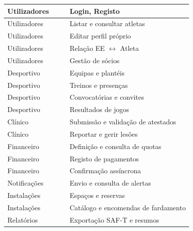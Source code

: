\begin{center}
{\begin{xltabular}{\textwidth}{|>{\raggedright\arraybackslash}p{2cm}|>{\raggedright\arraybackslash}p{4cm}|>{\raggedright\arraybackslash}p{3.7cm}|>{\raggedright\arraybackslash}X|}
Utilizadores  &           &          & Login, Registo \\ \hline
Utilizadores  &       &      & Listar e consultar atletas \\ \hline
Utilizadores  &        &       & Editar perfil próprio \\ \hline
Utilizadores  &       &      & Relação EE $\leftrightarrow$ Atleta \\ \hline
Utilizadores  &         &        & Gestão de sócios \\ \hline
Desportivo    &          &        & Equipas e plantéis \\ \hline
Desportivo    &        &    & Treinos e presenças \\ \hline
Desportivo    &  &        & Convocatórias e convites \\ \hline
Desportivo    &    &       & Resultados de jogos \\ \hline
Clínico       &      &      & Submissão e validação de atestados \\ \hline
Clínico       &         &   & Reportar e gerir lesões \\ \hline
Financeiro    &         &      & Definição e consulta de quotas \\ \hline
Financeiro    &     &    & Registo de pagamentos \\ \hline
Financeiro    &       &    & Confirmação assíncrona \\ \hline
Notificações  &  &       & Envio e consulta de alertas \\ \hline
Instalações   &     &          & Espaços e reservas \\ \hline
Instalações   &           &     & Catálogo e encomendas de fardamento \\ \hline
Relatórios    &        &             & Exportação SAF-T e resumos \\ \hline
\end{xltabular}
}
\end{center}

